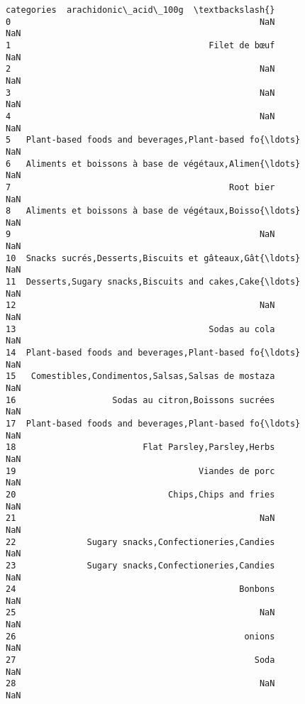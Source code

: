 \documentclass[11pt]{article}
\makeatletter
\newcommand{\boxspacing}{\kern\kvtcb@left@rule\kern\kvtcb@boxsep}
\newcommand{\prompt}[4]{
        \ttfamily\llap{{\color{#2}[#3]:\hspace{3pt}#4}}\vspace{-\baselineskip}
    }
\makeatother
\begin{document}
            \begin{tcolorbox}[breakable, size=fbox, boxrule=.5pt, pad at break*=1mm, opacityfill=0]
\prompt{Out}{outcolor}{21}{\boxspacing}
\begin{Verbatim}[commandchars=\\\{\}]
                                           categories  arachidonic\_acid\_100g  \textbackslash{}
0                                                 NaN                    NaN
1                                       Filet de bœuf                    NaN
2                                                 NaN                    NaN
3                                                 NaN                    NaN
4                                                 NaN                    NaN
5   Plant-based foods and beverages,Plant-based fo{\ldots}                    NaN
6   Aliments et boissons à base de végétaux,Alimen{\ldots}                    NaN
7                                           Root bier                    NaN
8   Aliments et boissons à base de végétaux,Boisso{\ldots}                    NaN
9                                                 NaN                    NaN
10  Snacks sucrés,Desserts,Biscuits et gâteaux,Gât{\ldots}                    NaN
11  Desserts,Sugary snacks,Biscuits and cakes,Cake{\ldots}                    NaN
12                                                NaN                    NaN
13                                      Sodas au cola                    NaN
14  Plant-based foods and beverages,Plant-based fo{\ldots}                    NaN
15   Comestibles,Condimentos,Salsas,Salsas de mostaza                    NaN
16                   Sodas au citron,Boissons sucrées                    NaN
17  Plant-based foods and beverages,Plant-based fo{\ldots}                    NaN
18                         Flat Parsley,Parsley,Herbs                    NaN
19                                    Viandes de porc                    NaN
20                              Chips,Chips and fries                    NaN
21                                                NaN                    NaN
22              Sugary snacks,Confectioneries,Candies                    NaN
23              Sugary snacks,Confectioneries,Candies                    NaN
24                                            Bonbons                    NaN
25                                                NaN                    NaN
26                                             onions                    NaN
27                                               Soda                    NaN
28                                                NaN                    NaN

\end{Verbatim}
\end{tcolorbox}
\end{document}
